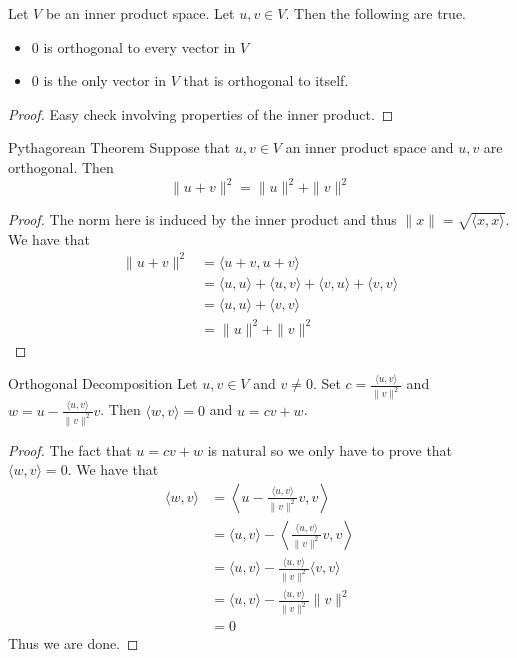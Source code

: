 \documentclass[a4paper]{article}
\begin{document}
\begin{crl}{}{} Let $V$ be an inner product space. Let $u,v\in V$. Then the following are true. 
\begin{itemize}
\item $0$ is orthogonal to every vector in $V$
\item $0$ is the only vector in $V$ that is orthogonal to itself. 
\end{itemize} \tcbline
\begin{proof}
Easy check involving properties of the inner product. 
\end{proof}
\end{crl}

\begin{thm}{Pythagorean Theorem}{} Suppose that $u,v\in V$ an inner product space and $u,v$ are orthogonal. Then $$\|u+v\|^2=\|u\|^2+\|v\|^2$$ \tcbline
\begin{proof}
The norm here is induced by the inner product and thus $\|x\|=\sqrt{\langle x,x\rangle}$. We have that 
\begin{align*}
\|u+v\|^2&=\langle u+v,u+v\rangle\\
&=\langle u,u\rangle+\langle u,v\rangle+\langle v,u\rangle+\langle v,v\rangle\\
&=\langle u,u\rangle+\langle v,v\rangle\\
&=\|u\|^2+\|v\|^2
\end{align*}
\end{proof}
\end{thm}

\begin{thm}{Orthogonal Decomposition}{} Let $u,v\in V$ and $v\neq 0$. Set $c=\frac{\langle u,v\rangle}{\|v\|^2}$ and $w=u-\frac{\langle u,v\rangle}{\|v\|^2}v$. Then $\langle w,v\rangle=0$ and $u=cv+w$. \tcbline
\begin{proof}
The fact that $u=cv+w$ is natural so we only have to prove that $\langle w,v\rangle=0$. We have that 
\begin{align*}
\langle w,v\rangle&=\left\langle u-\frac{\langle u,v\rangle}{\|v\|^2}v,v\right\rangle\\
&=\langle u,v\rangle-\left\langle \frac{\langle u,v\rangle}{\|v\|^2}v,v\right\rangle\\
&=\langle u,v\rangle-\frac{\langle u,v\rangle}{\|v\|^2}\langle v,v\rangle\\
&=\langle u,v\rangle-\frac{\langle u,v\rangle}{\|v\|^2}\|v\|^2\\
&=0
\end{align*}
Thus we are done. 
\end{proof}
\end{thm}
\end{document}
